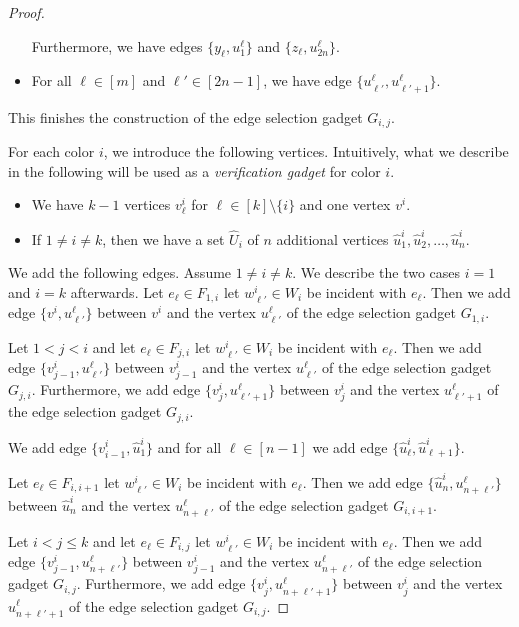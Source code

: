 \documentclass[11pt,a4paper]{article}
\theoremstyle{remark}
\theoremstyle{definition}
\begin{document}
\begin{proof}
\begin{itemize}
        Furthermore, we have edges $\{y_\ell,u^\ell_1\}$ and $\{z_\ell,u^\ell_{2n}\}$.
        \item For all $\ell\in [m]$ and $\ell'\in [2n-1]$, we have edge $\{u^\ell_{\ell'},u^\ell_{\ell'+1}\}$.
    \end{itemize}
    This finishes the construction of the edge selection gadget $G_{i,j}$.

    For each color $i$, we introduce the following vertices. Intuitively, what we describe in the following will be used as a \emph{verification gadget} for color $i$.
    \begin{itemize}
        \item We have $k-1$ vertices $v^i_\ell$ for $\ell\in[k]\setminus\{i\}$ and one vertex $v^i$.
        \item If $1\neq i\neq k$, then we have a set $\hat{U}_i$ of $n$ additional vertices $\hat{u}^i_1,\hat{u}^i_2,\ldots,\hat{u}^i_n$.
    \end{itemize}
    We add the following edges. Assume $1\neq i \neq k$. We describe the two cases $i=1$ and $i=k$ afterwards. Let $e_\ell\in F_{1,i}$ let $w^i_{\ell'}\in W_i$ be incident with $e_\ell$. Then we add edge $\{v^i,u^\ell_{\ell'}\}$ between $v^i$ and the vertex $u^\ell_{\ell'}$ of the edge selection gadget $G_{1,i}$. 
    
    Let $1<j<i$ and let $e_\ell\in F_{j,i}$ let $w^i_{\ell'}\in W_i$ be incident with $e_\ell$. Then we add edge $\{v_{j-1}^i,u^\ell_{\ell'}\}$ between $v^i_{j-1}$ and the vertex $u^\ell_{\ell'}$ of the edge selection gadget $G_{j,i}$.
    Furthermore, we add edge $\{v_{j}^i,u^\ell_{\ell'+1}\}$ between $v^i_j$ and the vertex $u^\ell_{\ell'+1}$ of the edge selection gadget $G_{j,i}$.

    We add edge $\{v^i_{i-1},\hat{u}^i_1\}$ and for all $\ell\in[n-1]$ we add edge $\{\hat{u}^i_\ell,\hat{u}^i_{\ell+1}\}$. 
    
    Let $e_\ell\in F_{i,i+1}$ let $w^i_{\ell'}\in W_i$ be incident with $e_\ell$. Then we add edge $\{\hat{u}^i_n,u^\ell_{n+\ell'}\}$ between $\hat{u}^i_n$ and the vertex $u^\ell_{n+\ell'}$ of the edge selection gadget $G_{i,i+1}$.

    Let $i<j\le k$ and let $e_\ell\in F_{i,j}$ let $w^i_{\ell'}\in W_i$ be incident with $e_\ell$. Then we add edge $\{v_{j-1}^i,u^\ell_{n+\ell'}\}$ between $v^i_{j-1}$ and the vertex $u^\ell_{n+\ell'}$ of the edge selection gadget $G_{i,j}$.
    Furthermore, we add edge $\{v_{j}^i,u^\ell_{n+\ell'+1}\}$ between $v^i_j$ and the vertex $u^\ell_{n+\ell'+1}$ of the edge selection gadget $G_{i,j}$.


\end{proof}
\end{document}
